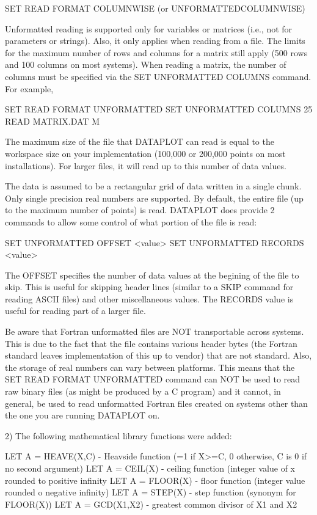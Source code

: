 {          SET READ FORMAT COLUMNWISE (or UNFORMATTEDCOLUMNWISE)

    Unformatted reading is supported only for variables or matrices
    (i.e., not for parameters or strings).  Also, it only applies
    when reading from a file.  The limits for the maximum number of
    rows and columns for a matrix still apply (500 rows and 100
    columns on most systems).  When reading a matrix, the number of
    columns must be specified via the SET UNFORMATTED COLUMNS
    command.  For example,

          SET READ FORMAT UNFORMATTED
          SET UNFORMATTED COLUMNS 25
          READ MATRIX.DAT M

    The maximum size of the file that DATAPLOT can read is equal to
    the workspace size on your implementation (100,000 or 200,000
    points on most installations).  For larger files, it will read
    up to this number of data values.

    The data is assumed to be a rectangular grid of data written in
    a single chunk.  Only single precision real numbers are
    supported.  By default, the entire file (up to the maximum number
    of points) is read.  DATAPLOT does provide 2 commands to allow
    some control of what portion of the file is read:

          SET UNFORMATTED OFFSET <value>
          SET UNFORMATTED RECORDS <value>

    The OFFSET specifies the number of data values at the begining of
    the file to skip.  This is useful for skipping header lines
    (similar to a SKIP command for reading ASCII files) and other
    miscellaneous values.  The RECORDS value is useful for reading
    part of a larger file.

    Be aware that Fortran unformatted files are NOT transportable
    across systems.  This is due to the fact that the file contains
    various header bytes (the Fortran standard leaves implementation
    of this up to vendor) that are not standard.  Also, the storage
    of real numbers can vary between platforms.  This means that
    the SET READ FORMAT UNFORMATTED command can NOT be used to read
    raw binary files (as might be produced by a C program) and it
    cannot, in general, be used to read unformatted Fortran files
    created on systems other than the one you are running DATAPLOT on.

 2) The following mathematical library functions were added:

       LET A = HEAVE(X,C)  - Heavside function (=1 if X>=C, 0
                             otherwise, C is 0 if no second argument)
       LET A = CEIL(X)     - ceiling function (integer value of x
                             rounded to positive infinity
       LET A = FLOOR(X)    - floor function (integer value rounded o
                             negative infinity)
       LET A = STEP(X)     - step function (synonym for FLOOR(X))
       LET A = GCD(X1,X2)  - greatest common divisor of X1 and X2

}
